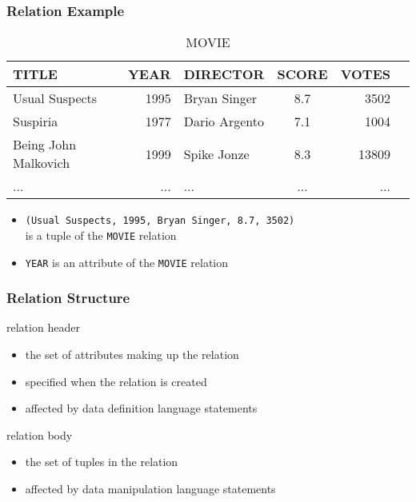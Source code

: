 \documentclass[dvipsnames]{beamer}
\theoremstyle{plain}
\begin{document}
\begin{frame}
  \frametitle{Relation Example}

  \begin{example}
    \begin{tiny}
    \begin{table}
      \caption{MOVIE}
      \begin{tabular}{|l|r|l|c|r|r|}\hline
TITLE                & YEAR & DIRECTOR      & SCORE & VOTES\\\hline\hline
Usual Suspects       & 1995 & Bryan Singer  &   8.7 &  3502\\\hline
Suspiria             & 1977 & Dario Argento &   7.1 &  1004\\\hline
Being John Malkovich & 1999 & Spike Jonze   &   8.3 & 13809\\\hline
...                  &  ... & ...           &   ... &   ...\\\hline
      \end{tabular}
    \end{table}
    \end{tiny}

    \pause
    \begin{itemize}
      \item \texttt{(Usual Suspects, 1995, Bryan Singer, 8.7, 3502)}\\
        is a tuple of the \texttt{MOVIE} relation
      \item \texttt{YEAR} is an attribute of the \texttt{MOVIE} relation
    \end{itemize}
  \end{example}
\end{frame}

\begin{frame}
  \frametitle{Relation Structure}

  \begin{block}{relation header}
    \begin{itemize}
      \item the set of attributes making up the relation
      \item specified when the relation is created
      \item affected by data definition language statements
    \end{itemize}
  \end{block}

  \pause
  \begin{block}{relation body}
    \begin{itemize}
      \item the set of tuples in the relation
      \item affected by data manipulation language statements
    \end{itemize}
  \end{block}
\end{frame}
\end{document}
